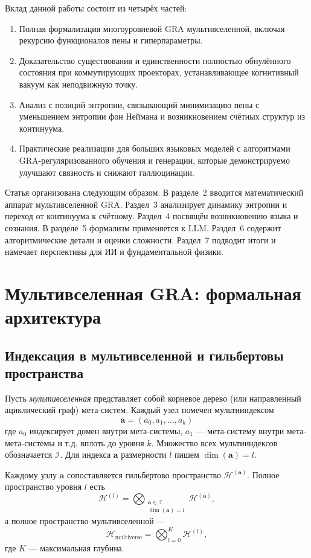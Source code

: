 \documentclass[11pt]{article}
\newcommand{\cH}{\mathcal{H}}
\newcommand{\cI}{\mathcal{I}}
\begin{document}
Вклад данной работы состоит из четырёх частей:
\begin{enumerate}
    \item Полная формализация многоуровневой GRA мультивселенной, включая рекурсию функционалов пены и гиперпараметры.
    \item Доказательство существования и единственности полностью обнулённого состояния при коммутирующих проекторах, устанавливающее когнитивный вакуум как неподвижную точку.
    \item Анализ с позиций энтропии, связывающий минимизацию пены с уменьшением энтропии фон Неймана и возникновением счётных структур из континуума.
    \item Практические реализации для больших языковых моделей с алгоритмами GRA-регуляризованного обучения и генерации, которые демонстрируемо улучшают связность и снижают галлюцинации.
\end{enumerate}

Статья организована следующим образом. В разделе~2 вводится математический аппарат мультивселенной GRA. Раздел~3 анализирует динамику энтропии и переход от континуума к счётному. Раздел~4 посвящён возникновению языка и сознания. В разделе~5 формализм применяется к LLM. Раздел~6 содержит алгоритмические детали и оценки сложности. Раздел~7 подводит итоги и намечает перспективы для ИИ и фундаментальной физики.

\section{Мультивселенная GRA: формальная архитектура}
\label{sec:gra}

\subsection{Индексация в мультивселенной и гильбертовы пространства}
Пусть \emph{мультивселенная} представляет собой корневое дерево (или направленный ациклический граф) мета-систем. Каждый узел помечен мультииндексом
\[
\mathbf{a} = (a_0, a_1, \dots, a_k)
\]
где $a_0$ индексирует домен внутри мета-системы, $a_1$ --- мета-систему внутри мета-мета-системы и т.д. вплоть до уровня $k$. Множество всех мультииндексов обозначается $\cI$. Для индекса $\mathbf{a}$ размерности $l$ пишем $\dim(\mathbf{a}) = l$.

Каждому узлу $\mathbf{a}$ сопоставляется гильбертово пространство $\cH^{(\mathbf{a})}$. Полное пространство уровня $l$ есть
\[
\cH^{(l)} = \bigotimes_{\substack{\mathbf{a} \in \cI \\ \dim(\mathbf{a})=l}} \cH^{(\mathbf{a})},
\]
а полное пространство мультивселенной ---
\[
\cH_{\text{multiverse}} = \bigotimes_{l=0}^{K} \cH^{(l)},
\]
где $K$ --- максимальная глубина.
\end{document}
